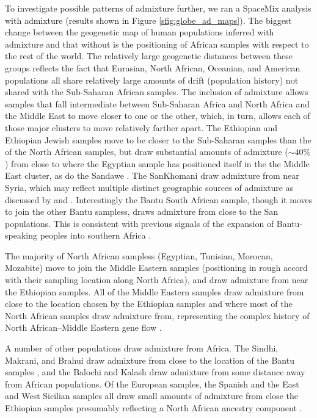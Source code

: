 \documentclass[12pt]{article}
\begin{document}
To investigate possible patterns of admixture further, we ran a SpaceMix analysis with admixture (results shown in Figure \ref{sfig:globe_ad_maps}). The biggest change between the geogenetic map of human populations inferred with admixture and that without is the positioning of African samples with respect to the rest of the world.  The relatively large geogenetic distances between these groups reflects the fact that Eurasian, North African, Oceanian, and American populations all share relatively large amounts of drift (population history) not shared with the Sub-Saharan African samples. The inclusion of admixture allows samples that fall intermediate between Sub-Saharan Africa and North Africa and the Middle East to move closer to one or the other, which, in turn, allows each of those major clusters to move relatively farther apart.  The Ethiopian and Ethiopian Jewish samples move to be closer to the Sub-Saharan samples than the of the North African samples, but draw substantial amounts of admixture ($\sim 40\%$) from close to where the Egyptian sample has positioned itself in the the Middle East cluster, as do the Sandawe \citep{hodgson_early_2014,Pickrell:12}. The SanKhomani draw admixture from near Syria, which may reflect multiple distinct geographic sources of admixture as discussed by \citep{Hellenthal} and \citep{Pickrell:14}. 
Interestingly the Bantu South African sample, though it moves to join the other Bantu sampless, draws admixture from close to the San populations. This is consistent with previous signals of the expansion of Bantu-speaking peoples into southern Africa  \citep{Pickrell:12,Jakobsson_genomic_2012,Pickrell:14,Hellenthal}. 

The majority of North African sampless (Egyptian, Tunisian, Morocan, Mozabite) move to join the Middle Eastern samples (positioning in rough accord with their sampling location along North Africa), and draw admixture from near the Ethiopian samples. All of the Middle Eastern samples draw admixture from close to the location chosen by the Ethiopian samples and where most of the North African samples draw admixture from, representing the complex history of North African--Middle Eastern gene flow \citep{henn_genomic_2012,Hellenthal}. 

A number of other populations draw admixture from Africa. The Sindhi, Makrani, and Brahui draw admixture from close to the location of the Bantu samples \citep{Hellenthal}, and the Balochi and Kalash draw admixture from some distance away from African populations.  Of the European samples, the Spanish and the East and West Sicilian samples all draw small amounts of admixture from close the Ethiopian samples presumably reflecting a North African ancestry component \citep{moorjani_history_2011,botigue_gene_2013}. 
\end{document}
